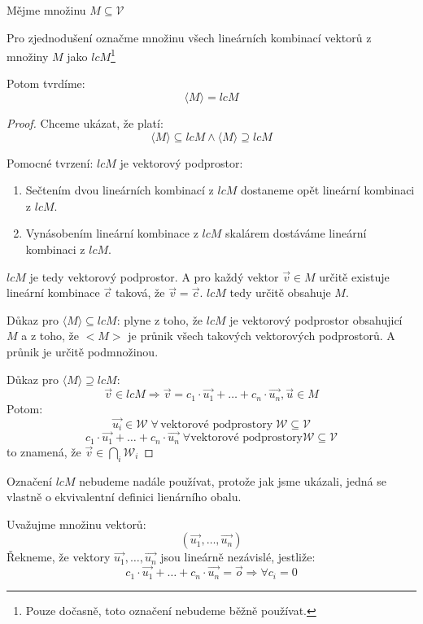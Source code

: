 \begin{theorem}
    Mějme množinu $M \subseteq \mathcal{V}$

    Pro zjednodušení označme množinu všech lineárních kombinací
    vektorů z množiny $M$ jako $lcM$\footnote{Pouze dočasně, toto
    označení nebudeme běžně používat.}

    Potom tvrdíme:
    $$\langle M \rangle = lcM$$
\end{theorem}
\begin{proof}
    Chceme ukázat, že platí:
    $$\langle M \rangle \subseteq lcM \wedge \langle M \rangle \supseteq lcM$$

    Pomocné tvrzení: $lcM$ je vektorový podprostor:
    \begin{enumerate}
        \item Sečtením dvou lineárních kombinací z $lcM$ dostaneme opět lineární kombinaci z $lcM$.
        \item Vynásobením lineární kombinace z $lcM$ skalárem dostáváme lineární kombinaci z $lcM$.
    \end{enumerate}
    $lcM$ je tedy vektorový podprostor. A pro každý vektor $\vec{v} \in M$ určitě existuje
    lineární kombinace $\vec{c}$ taková, že $\vec{v} = \vec{c}$. $lcM$ tedy určitě
    obsahuje $M$.

    Důkaz pro $\langle M \rangle \subseteq lcM$: plyne z toho, že $lcM$ je vektorový
    podprostor obsahujicí $M$ a z toho, že $<M>$ je průnik všech takových vektorových
    podprostorů. A průnik je určitě podmnožinou.

    Důkaz pro $\langle M \rangle \supseteq lcM$:
    $$\vec{v} \in lcM \Rightarrow \vec{v} = c_1
        \cdot \vec{u_1} + \ldots + c_n \cdot \vec{u_n}, \vec{u} \in M$$
    Potom:
    $$\vec{u_i} \in \mathcal{W}\; \forall\,\text{vektorové podprostory}\;
        \mathcal{W} \subseteq \mathcal{V}$$
    $$c_1 \cdot \vec{u_1} + \ldots + c_n \cdot \vec{u_n} \; \forall
    \text{vektorové podprostory} \mathcal{W} \subseteq \mathcal{V}$$
    to znamená, že $\vec{v} \in \bigcap\limits_{i} \mathcal{W}_i$
\end{proof}

Označení $lcM$ nebudeme nadále používat, protože jak jsme ukázali, jedná se vlastně
o ekvivalentní definici lienárního obalu.

\begin{definition}
    Uvažujme množinu vektorů:
    $$(\vec{u_1}, \ldots, \vec{u_n})$$
    Řekneme, že vektory $\vec{u_1}, \ldots, \vec{u_n}$ jsou lineárně nezávislé,
    jestliže:
    $$c_1\cdot\vec{u_1}+\ldots +c_n\cdot\vec{u_n} = \vec{o} \Rightarrow \forall c_i = 0$$
\end{definition}

